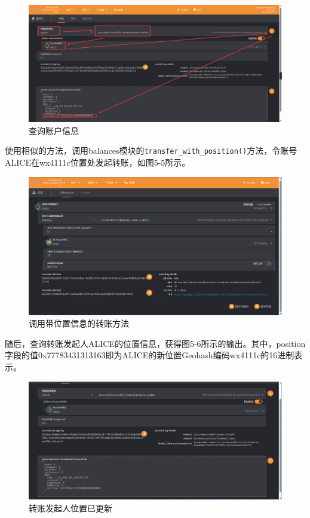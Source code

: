 \begin{figure}[htbp]
    \centering
    \includegraphics[width=\textwidth]{images/watchAccInfo.png}
    \caption{查询账户信息}\label{查询账户信息} %
\end{figure}

使用相似的方法，调用balances模块的\verb|transfer_with_position()|方法，令账号ALICE在wx4111c位置处发起转账，如图5-5所示。

\begin{figure}[H]
    \centering
    \includegraphics[width=\textwidth]{images/transWithPos.png}
    \caption{调用带位置信息的转账方法}\label{调用带位置信息的转账方法} %
\end{figure}

随后，查询转账发起人ALICE的位置信息，获得图5-6所示的输出。其中，position字段的值0x77783431313163即为ALICE的新位置Geohash编码wx4111c的16进制表示。

\begin{figure}[H]
    \centering
    \includegraphics[width=\textwidth]{images/transWithPosResult.png}
    \caption{转账发起人位置已更新}\label{转账发起人位置已更新} %
\end{figure}

